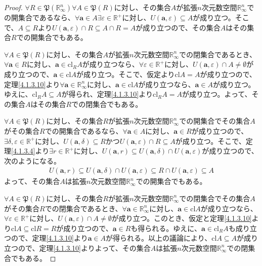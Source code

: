\documentclass[dvipdfmx]{jsarticle}
\begin{document}
\begin{proof}
$\forall R \in \mathfrak{P}\left( \mathbb{R}_{\infty}^{n} \right)\forall A \in \mathfrak{P}(R)$に対し、その集合$A$が拡張$n$次元数空間$\mathbb{R}_{\infty}^{n}$での開集合であるなら、$\forall\mathbf{a} \in A\exists\varepsilon \in \mathbb{R}^{+}$に対し、$U\left( \mathbf{a},\varepsilon \right) \subseteq A$が成り立つ。そこで、$A \subseteq R$より$U\left( \mathbf{a},\varepsilon \right) \cap R \subseteq A \cap R = A$が成り立つので、その集合$A$はその集合$R$での開集合でもある。\par
$\forall A \in \mathfrak{P}(R)$に対し、その集合$A$が拡張$n$次元数空間$\mathbb{R}_{\infty}^{n}$での閉集合であるとき、$\forall\mathbf{a} \in R$に対し、$\mathbf{a} \in \mathrm{cl}_{R}A$が成り立つなら、$\forall\varepsilon \in \mathbb{R}^{\mathbf{+}}$に対し、$U\left( \mathbf{a},\varepsilon \right) \cap A \neq \emptyset$が成り立つので、$\mathbf{a} \in \mathrm{cl}A$が成り立つ。そこで、仮定より$\mathrm{cl}A = A$が成り立つので、定理\ref{4.1.3.10}より$\forall\mathbf{a} \in \mathbb{R}_{\infty}^{n}$に対し、$\mathbf{a} \in \mathrm{cl}A$が成り立つなら、$\mathbf{a} \in A$が成り立つ。ゆえに、$\mathrm{cl}_{R}A \subseteq A$が得られ、定理\ref{4.1.3.10}より$\mathrm{cl}_{R}A = A$が成り立つ。よって、その集合$A$はその集合$R$での閉集合でもある。\par
$\forall A \in \mathfrak{P}(R)$に対し、その集合$R$が拡張$n$次元数空間$\mathbb{R}_{\infty}^{n}$での開集合でその集合$A$がその集合$R$での開集合であるなら、$\forall\mathbf{a} \in A$に対し、$\mathbf{a} \in R$が成り立つので、$\exists\delta,\varepsilon \in \mathbb{R}^{+}$に対し、$U\left( \mathbf{a},\delta \right) \subseteq R$かつ$U\left( \mathbf{a},\varepsilon \right) \cap R \subseteq A$が成り立つ。そこで、定理\ref{4.1.3.4}より$\exists r \in \mathbb{R}^{+}$に対し、$U\left( \mathbf{a},r \right) \subseteq U\left( \mathbf{a},\delta \right) \cap U\left( \mathbf{a},\varepsilon \right)$が成り立つので、次のようになる。
\begin{align*}
U\left( \mathbf{a},r \right) \subseteq U\left( \mathbf{a},\delta \right) \cap U\left( \mathbf{a},\varepsilon \right) \subseteq R \cap U\left( \mathbf{a},\varepsilon \right) \subseteq A
\end{align*}
よって、その集合$A$は拡張$n$次元数空間$\mathbb{R}_{\infty}^{n}$での開集合でもある。\par
$\forall A \in \mathfrak{P}(R)$に対し、その集合$R$が拡張$n$次元数空間$\mathbb{R}_{\infty}^{n}$での閉集合でその集合$A$がその集合$R$での閉集合であるとき、$\forall\mathbf{a} \in \mathbb{R}_{\infty}^{n}$に対し、$\mathbf{a} \in \mathrm{cl}A$が成り立つなら、$\forall\varepsilon \in \mathbb{R}^{\mathbf{+}}$に対し、$U\left( \mathbf{a},\varepsilon \right) \cap A \neq \emptyset$が成り立つ。このとき、仮定と定理\ref{4.1.3.10}より$\mathrm{cl}A \subseteq \mathrm{cl}R = R$が成り立つので、$\mathbf{a} \in R$も得られる。ゆえに、$\mathbf{a} \in \mathrm{cl}_{R}A$も成り立つので、定理\ref{4.1.3.10}より$\mathbf{a} \in A$が得られる。以上の議論により、$\mathrm{cl}A \subseteq A$が成り立つので、定理\ref{4.1.3.10}よりよって、その集合$A$は拡張$n$次元数空間$\mathbb{R}_{\infty}^{n}$での閉集合でもある。
\end{proof}
\end{document}
